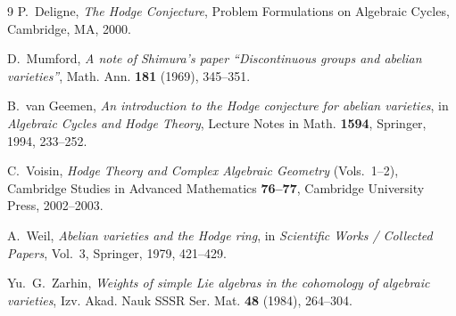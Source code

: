 \documentclass[11pt,a4paper]{article}
\begin{document}
\begin{thebibliography}{9}
P.~Deligne, \emph{The Hodge Conjecture}, Problem Formulations on Algebraic Cycles, Cambridge, MA, 2000.

D.~Mumford, \emph{A note of Shimura's paper ``Discontinuous groups and abelian varieties''}, Math. Ann. \textbf{181} (1969), 345--351.

B.~van Geemen, \emph{An introduction to the Hodge conjecture for abelian varieties}, in \emph{Algebraic Cycles and Hodge Theory}, Lecture Notes in Math. \textbf{1594}, Springer, 1994, 233--252.

C.~Voisin, \emph{Hodge Theory and Complex Algebraic Geometry} (Vols.~1--2), Cambridge Studies in Advanced Mathematics \textbf{76--77}, Cambridge University Press, 2002--2003.

A.~Weil, \emph{Abelian varieties and the Hodge ring}, in \emph{Scientific Works / Collected Papers}, Vol.~3, Springer, 1979, 421--429.

Yu.~G.~Zarhin, \emph{Weights of simple Lie algebras in the cohomology of algebraic varieties}, Izv. Akad. Nauk SSSR Ser. Mat. \textbf{48} (1984), 264--304.
\end{thebibliography}
\end{document}
